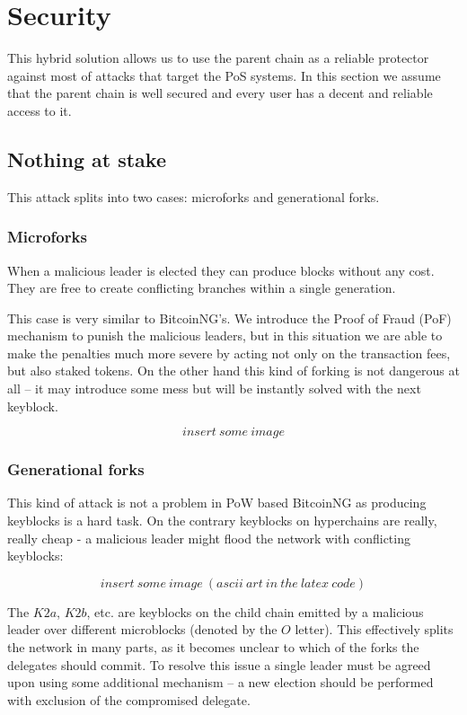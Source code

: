 \section{Security}

This hybrid solution allows us to use the parent chain as a
reliable protector against most of attacks that target the PoS systems.
\cite{pos_attacks}
In this section we assume that the parent chain is well secured and every
user has a decent and reliable access to it.

\subsection{Nothing at stake}

This attack splits into two cases: microforks and generational forks.

\subsubsection{Microforks}

When a malicious leader is elected they can produce blocks without any cost.
They are free to create conflicting branches within a single generation.

This case is very similar to BitcoinNG's. We introduce the Proof of Fraud (PoF)
mechanism to punish the malicious leaders, but in this situation we are able to
make the penalties much more severe by acting not only on the transaction fees,
but also staked tokens. On the other hand this kind of forking is
not dangerous at all – it may introduce some mess but will be instantly solved
with the next keyblock.

$$insert\ some\ image$$

\subsubsection{Generational forks}

This kind of attack is not a problem in PoW based BitcoinNG as producing
keyblocks is a hard task. On the contrary keyblocks on hyperchains are really,
really cheap - a malicious leader might flood the network with conflicting
keyblocks:

$$insert\ some\ image\ (ascii\ art\ in\ the\ latex\ code)$$

The $K2a$, $K2b$, etc. are keyblocks on the child chain emitted by a malicious
leader over different microblocks (denoted by the $O$ letter). This
effectively splits the network in many parts, as it becomes unclear to which of
the forks the delegates should commit. To resolve this issue a single leader
must be agreed upon using some additional mechanism – a new election
should be performed with exclusion of the compromised delegate.

